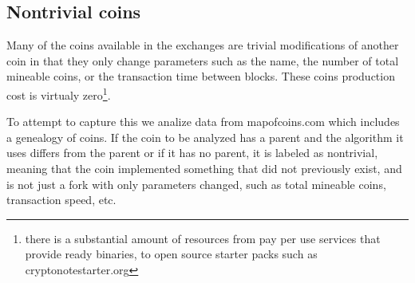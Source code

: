 \subsection{Nontrivial coins}

Many of the coins available in the exchanges are trivial modifications of another coin in that they only change parameters such as the name, the number of total mineable coins, or the transaction time between blocks.
These coins production cost is virtualy zero\footnote{ there is a substantial amount of resources from pay per use services that provide ready binaries, to open source starter packs such as cryptonotestarter.org}.

To attempt to capture this we analize data from mapofcoins.com which includes a genealogy of coins.
If the coin to be analyzed has a parent and the algorithm it uses differs from the parent or if it has no parent, it is labeled as nontrivial, meaning that the coin implemented something that did not previously exist, and is not just a fork with only parameters changed, such as total mineable coins, transaction speed, etc.

